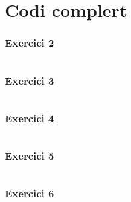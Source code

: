 \documentclass[catalan, a4paper]{scrartcl}
\begin{document}
\clearpage
\appendix

\part{Codi complert}

\section*{\label{code-ex2} Exercici 2}

\inputminted{haskell}{../p2/ex2.hs}

\clearpage
\section*{\label{code-ex3} Exercici 3}

\inputminted{haskell}{../p2/ex3.hs}

\clearpage
\section*{\label{code-ex4} Exercici 4}

\inputminted{haskell}{../p2/ex4.hs}

\clearpage
\section*{\label{code-ex5} Exercici 5}

\inputminted{haskell}{../p2/ex5.hs}

\clearpage
\section*{\label{code-ex6} Exercici 6}

\inputminted{haskell}{../p2/ex6.hs}
\end{document}
